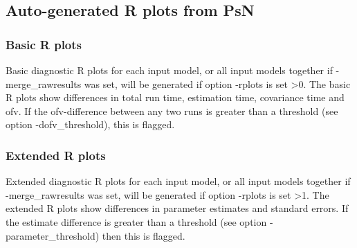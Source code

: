 \subsection{Auto-generated R plots from PsN}
\newcommand{\rplotsconditions}{The default benchmark template 
requires no special R libraries.
If no pdf is generated,
see the .Rout file in the main run directory for error messages.}


\subsubsection*{Basic R plots}
Basic diagnostic R plots for each input model, or all input models together if -merge\_rawresults was set, 
will be generated if option -rplots is set >0.
The basic R plots show differences in total run time, estimation time, covariance time and ofv.
If the ofv-difference between any two runs is greater than a threshold (see option -dofv\_threshold), this is flagged. 

\subsubsection*{Extended R plots}
Extended diagnostic R plots for each input model, or all input models together if -merge\_rawresults was set, 
will be generated if option -rplots is set >1.
The extended R plots show differences in parameter estimates and standard errors.
If the estimate difference is greater than a threshold (see option -parameter\_threshold) then this is flagged.
